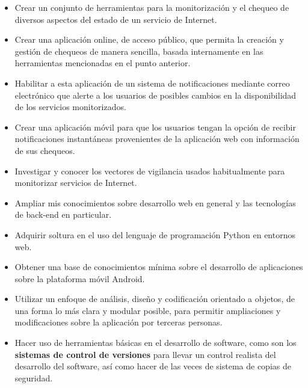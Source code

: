 \documentclass[a4paper,12pt]{article}
\begin{document}
\begin{itemize}

\item Crear un conjunto de herramientas para la monitorización y el chequeo de
  diversos aspectos del estado de un servicio de Internet.
\item Crear una aplicación online, de acceso público, que permita la creación y
  gestión de chequeos de manera sencilla, basada internamente en las
  herramientas mencionadas en el punto anterior.
\item Habilitar a esta aplicación de un sistema de notificaciones mediante correo
  electrónico que alerte a los usuarios de posibles cambios en la disponibilidad
  de los servicios monitorizados.
\item Crear una aplicación móvil para que los usuarios tengan la opción de
  recibir notificaciones instantáneas provenientes de la aplicación web con
  información de sus chequeos.

\item Investigar y conocer los vectores de vigilancia usados habitualmente para
  monitorizar servicios de Internet.
\item Ampliar mis conocimientos sobre desarrollo web en general y las
  tecnologías de back-end en particular.
\item Adquirir soltura en el uso del lenguaje de programación Python en entornos
  web.
\item Obtener una base de conocimientos mínima sobre el desarrollo de
  aplicaciones sobre la plataforma móvil Android.
\item Utilizar un enfoque de análisis, diseño y codificación orientado
  a objetos, de una forma lo más clara y modular posible, para
  permitir ampliaciones y modificaciones sobre la aplicación por
  terceras personas.
\item Hacer uso de herramientas básicas en el desarrollo de software,
  como son los \textbf{sistemas de control de versiones} para llevar
  un control realista del desarrollo del software, así como hacer de
  las veces de sistema de copias de seguridad.

\end{itemize}

\end{document}
